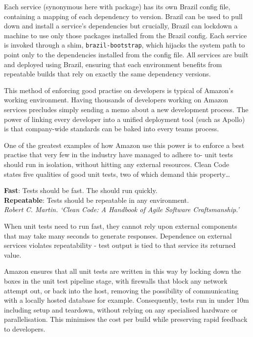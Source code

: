 \documentclass[11pt]{article}
\begin{document}
Each service (synonymous here with package) has its own Brazil config file,
containing a mapping of each dependency to version. Brazil can be used to pull
down and install a service's dependencies but crucially, Brazil can lockdown a
machine to use only those packages installed from the Brazil config.  Each
service is invoked through a shim, \texttt{brazil-bootstrap}, which hijacks the
system path to point only to the dependencies installed from the config file.
All services are built and deployed using Brazil, ensuring that each environment
benefits from repeatable builds that rely on exactly the same dependency
versions.

This method of enforcing good practise on developers is typical of Amazon's
working environment. Having thousands of developers working on Amazon services
precludes simply sending a memo about a new development process. The power of
linking every developer into a unified deployment tool (such as Apollo) is that
company-wide standards can be baked into every teams process.

One of the greatest examples of how Amazon use this power is to enforce a best
practise that very few in the industry have managed to adhere to- unit tests
should run in isolation, without hitting any external resources. Clean
Code~\cite{cleanCode} states five qualities of good unit tests, two of which
demand this property\dots

\begin{displayquote}

  \textbf{Fast}: Tests should be fast. The should run quickly. \\
  \textbf{Repeatable}: Tests should be repeatable in any environment. \\

  \textit{Robert C. Martin. `Clean Code: A Handbook of Agile Software
  Craftsmanship.'}

\end{displayquote}

When unit tests need to run fast, they cannot rely upon external components that
may take many seconds to generate responses. Dependence on external services
violates repeatability - test output is tied to that service its returned value.

Amazon ensures that all unit tests are written in this way by locking down the
boxes in the unit test pipeline stage, with firewalls that block any network
attempt out, or back into the host, removing the possibility of communicating
with a locally hosted database for example. Consequently, tests run in under 10m
including setup and teardown, without relying on any specialised hardware or
parallelisation. This minimises the cost per build while preserving rapid
feedback to developers.
\end{document}
